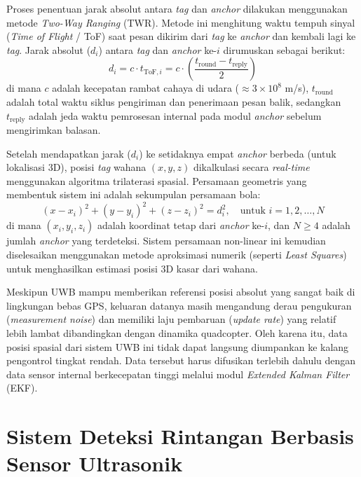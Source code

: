 \documentclass[12pt,a4paper]{report}
\numberwithin{equation}{chapter}
\begin{document}
Proses penentuan jarak absolut antara \textit{tag} dan \textit{anchor} dilakukan menggunakan metode \textit{Two-Way Ranging} (TWR). Metode ini menghitung waktu tempuh sinyal (\textit{Time of Flight} / ToF) saat pesan dikirim dari \textit{tag} ke \textit{anchor} dan kembali lagi ke \textit{tag}. Jarak absolut ($d_i$) antara \textit{tag} dan \textit{anchor} ke-$i$ dirumuskan sebagai berikut:
\begin{equation}
    d_i = c \cdot t_{\text{ToF}, i} = c \cdot \left( \frac{t_{\text{round}} - t_{\text{reply}}}{2} \right)
\end{equation}
di mana $c$ adalah kecepatan rambat cahaya di udara ($\approx 3 \times 10^8$ m/s), $t_{\text{round}}$ adalah total waktu siklus pengiriman dan penerimaan pesan balik, sedangkan $t_{\text{reply}}$ adalah jeda waktu pemrosesan internal pada modul \textit{anchor} sebelum mengirimkan balasan.

Setelah mendapatkan jarak ($d_i$) ke setidaknya empat \textit{anchor} berbeda (untuk lokalisasi 3D), posisi \textit{tag} wahana $(x, y, z)$ dikalkulasi secara \textit{real-time} menggunakan algoritma trilaterasi spasial. Persamaan geometris yang membentuk sistem ini adalah sekumpulan persamaan bola:
\begin{equation}
    (x - x_i)^2 + (y - y_i)^2 + (z - z_i)^2 = d_i^2, \quad \text{untuk } i = 1, 2, \dots, N
\end{equation}
di mana $(x_i, y_i, z_i)$ adalah koordinat tetap dari \textit{anchor} ke-$i$, dan $N \ge 4$ adalah jumlah \textit{anchor} yang terdeteksi. Sistem persamaan non-linear ini kemudian diselesaikan menggunakan metode aproksimasi numerik (seperti \textit{Least Squares}) untuk menghasilkan estimasi posisi 3D kasar dari wahana.

Meskipun UWB mampu memberikan referensi posisi absolut yang sangat baik di lingkungan bebas GPS, keluaran datanya masih mengandung derau pengukuran (\textit{measurement noise}) dan memiliki laju pembaruan (\textit{update rate}) yang relatif lebih lambat dibandingkan dengan dinamika quadcopter. Oleh karena itu, data posisi spasial dari sistem UWB ini tidak dapat langsung diumpankan ke kalang pengontrol tingkat rendah. Data tersebut harus difusikan terlebih dahulu dengan data sensor internal berkecepatan tinggi melalui modul \textit{Extended Kalman Filter} (EKF\label{abbr:ekf}).

\section{Sistem Deteksi Rintangan Berbasis Sensor Ultrasonik}
\end{document}

